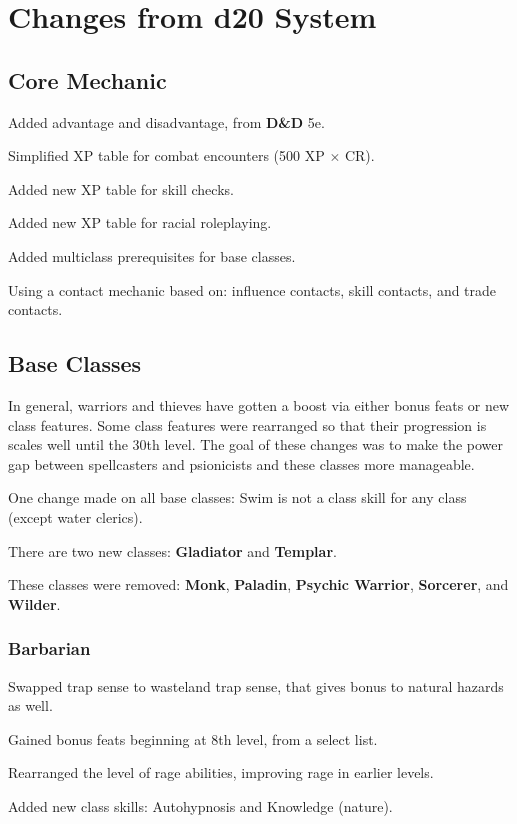 \chapter{Changes from d20 System}
\label{apx:Changes from d20 System}

\section{Core Mechanic}
\begin{itemize*}
\item Added advantage and disadvantage, from \textbf{D\&D} 5e.
\item Simplified XP table for combat encounters (500 XP $\times$ CR).
\item Added new XP table for skill checks.
\item Added new XP table for racial roleplaying.
\item Added multiclass prerequisites for base classes.
\item Using a contact mechanic based on: influence contacts, skill contacts, and trade contacts.
\end{itemize*}

\section{Base Classes}
In general, warriors and thieves have gotten a boost via either bonus feats or new class features. Some class features were rearranged so that their progression is scales well until the 30th level. The goal of these changes was to make the power gap between spellcasters and psionicists and these classes more manageable.

One change made on all base classes: Swim is not a class skill for any class (except water clerics).

There are two new classes: \textbf{Gladiator} and \textbf{Templar}.

These classes were removed: \textbf{Monk}, \textbf{Paladin}, \textbf{Psychic Warrior}, \textbf{Sorcerer}, and \textbf{Wilder}.

\subsection{Barbarian}
\begin{itemize*}
\item Swapped trap sense to wasteland trap sense, that gives bonus to natural hazards as well.
\item Gained bonus feats beginning at 8th level, from a select list.
\item Rearranged the level of rage abilities, improving rage in earlier levels.
\item Added new class skills: Autohypnosis and Knowledge (nature).
\end{itemize*}


